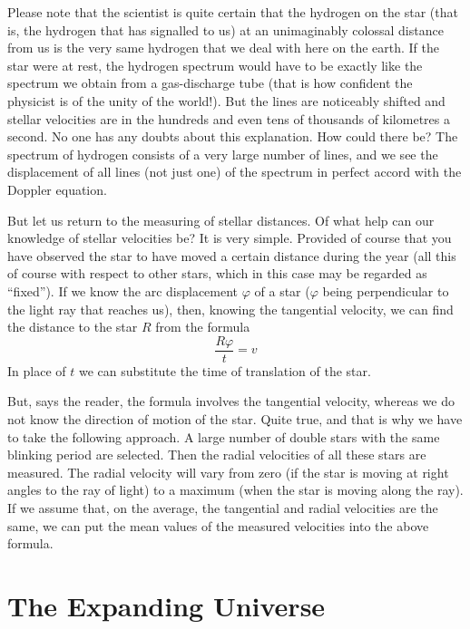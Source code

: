 Please note that the scientist is quite certain that the hydrogen on the star (that is, the hydrogen that has signalled to us) at an unimaginably colossal distance from us is the very same hydrogen that we deal with here on the earth. If the star were at rest, the hydrogen spectrum would have to be exactly like the spectrum we obtain from a gas-discharge tube (that is how confident the physicist is of the unity of the world!). But the lines are noticeably shifted and stellar velocities are in the hun­dreds and even tens of thousands of kilometres a second. No one has any doubts about this explanation. How could there be? The spectrum of hydrogen consists of a very large number of lines, and we see the displacement of all lines (not just one) of the spectrum in perfect accord with the Doppler equation.

But let us return to the measuring of stellar distances. Of what help can our knowledge of stellar velocities be? It is very simple. Provided of course that you have observed the star to have moved a certain distance during the year (all this of course with respect to other stars, which in this case may be regarded as ``fixed''). If we know the arc displacement $\varphi$ of a star ($\varphi$ being perpendic­ular to the light ray that reaches us), then, knowing the tangential velocity, we can find the distance to the star $R$ from the formula
\begin{equation*}%
\frac{R \varphi}{t} = v
\end{equation*}
In place of $t$ we can substitute the time of translation of the star.

But, says the reader, the formula involves the tangen­tial velocity, whereas we do not know the direction of motion of the star. Quite true, and that is why we have to take the following approach. A large number of double stars with the same blinking period are selected. Then the radial velocities of all these stars are measured. The radial velocity will vary from zero (if the star is moving at right angles to the ray of light) to a maximum (when the star is moving along the ray). If we assume that, on the average, the tangential and radial velocities are the same, we can put the mean values of the measured velocities into the above formula.


\section{The Expanding Universe}

